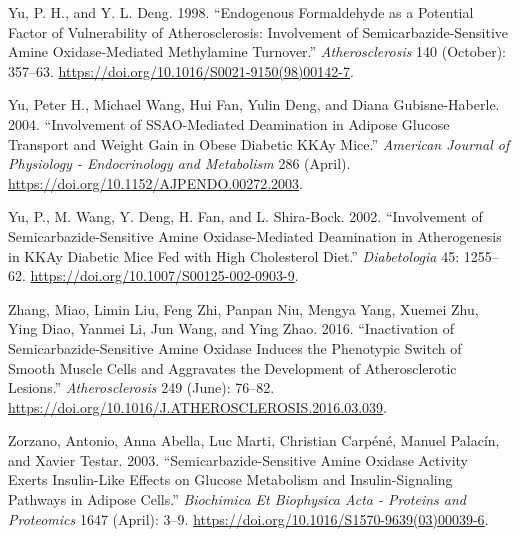 \documentclass[
  letterpaper,
  DIV=11,
  numbers=noendperiod]{scrreprt}
\newlength{\cslhangindent}
\newenvironment{CSLReferences}[2] %
 {\begin{list}{}{%
  \setlength{\itemindent}{0pt}
  \setlength{\leftmargin}{0pt}
  \setlength{\parsep}{0pt}
  \ifodd #1
   \setlength{\leftmargin}{\cslhangindent}
   \setlength{\itemindent}{-1\cslhangindent}
  \fi
  \setlength{\itemsep}{#2\baselineskip}}}
 {\end{list}}
\begin{document}
\begin{CSLReferences}{1}{0}
Yu, P. H., and Y. L. Deng. 1998. {``Endogenous Formaldehyde as a
Potential Factor of Vulnerability of Atherosclerosis: Involvement of
Semicarbazide-Sensitive Amine Oxidase-Mediated Methylamine Turnover.''}
\emph{Atherosclerosis} 140 (October): 357--63.
\url{https://doi.org/10.1016/S0021-9150(98)00142-7}.

Yu, Peter H., Michael Wang, Hui Fan, Yulin Deng, and Diana
Gubisne-Haberle. 2004. {``Involvement of SSAO-Mediated Deamination in
Adipose Glucose Transport and Weight Gain in Obese Diabetic KKAy
Mice.''} \emph{American Journal of Physiology - Endocrinology and
Metabolism} 286 (April).
\url{https://doi.org/10.1152/AJPENDO.00272.2003}.

Yu, P., M. Wang, Y. Deng, H. Fan, and L. Shira-Bock. 2002.
{``Involvement of Semicarbazide-Sensitive Amine Oxidase-Mediated
Deamination in Atherogenesis in KKAy Diabetic Mice Fed with High
Cholesterol Diet.''} \emph{Diabetologia} 45: 1255--62.
\url{https://doi.org/10.1007/S00125-002-0903-9}.

Zhang, Miao, Limin Liu, Feng Zhi, Panpan Niu, Mengya Yang, Xuemei Zhu,
Ying Diao, Yanmei Li, Jun Wang, and Ying Zhao. 2016. {``Inactivation of
Semicarbazide-Sensitive Amine Oxidase Induces the Phenotypic Switch of
Smooth Muscle Cells and Aggravates the Development of Atherosclerotic
Lesions.''} \emph{Atherosclerosis} 249 (June): 76--82.
\url{https://doi.org/10.1016/J.ATHEROSCLEROSIS.2016.03.039}.

Zorzano, Antonio, Anna Abella, Luc Marti, Christian Carpéné, Manuel
Palacín, and Xavier Testar. 2003. {``Semicarbazide-Sensitive Amine
Oxidase Activity Exerts Insulin-Like Effects on Glucose Metabolism and
Insulin-Signaling Pathways in Adipose Cells.''} \emph{Biochimica Et
Biophysica Acta - Proteins and Proteomics} 1647 (April): 3--9.
\url{https://doi.org/10.1016/S1570-9639(03)00039-6}.

\end{CSLReferences}



\printindex
\end{document}
